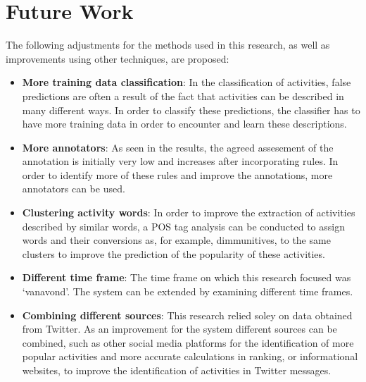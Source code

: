 \section{Future Work}\label{sec:fut}
The following adjustments for the methods used in this research, as well as improvements using other techniques, are proposed:
\begin{itemize}
\item \textbf{More training data classification}: In the classification of activities, false predictions are often a result of the fact that activities can be described in many different ways. In order to classify these predictions, the classifier has to have more training data in order to encounter and learn these descriptions.
\item \textbf{More annotators}: As seen in the results, the agreed assesement of the annotation is initially very low and increases after incorporating rules. In order to identify more of these rules and improve the annotations, more annotators can be used.
\item \textbf{Clustering activity words}: In order to improve the extraction of activities described by similar words, a POS tag analysis can be conducted to assign words and their conversions as, for example, dimmunitives, to the same clusters to improve the prediction of the popularity of these activities.
\item \textbf{Different time frame}: The time frame on which this research focused was `vanavond'. The system can be extended by examining different time frames.
\item \textbf{Combining different sources}: This research relied soley on data obtained from Twitter. As an improvement for the system different sources can be combined, such as other social media platforms for the identification of more popular activities and more accurate calculations in ranking, or informational websites, to improve the identification of activities in Twitter messages.
\end{itemize}
\fi